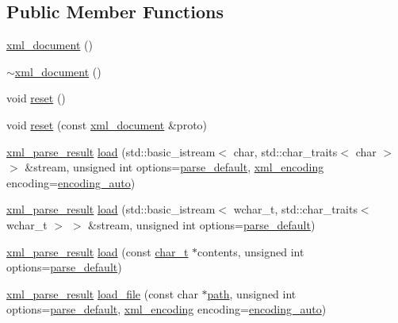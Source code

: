 \subsection*{Public Member Functions}
\begin{DoxyCompactItemize}
\item 
\hyperlink{classpugi_1_1xml__document_afa82ca6827bda8504ce7dadbc443fa21}{xml\-\_\-document} ()
\item 
\hyperlink{classpugi_1_1xml__document_af37d8a79f7465ad48d65c2bd13461580}{$\sim$xml\-\_\-document} ()
\item 
void \hyperlink{classpugi_1_1xml__document_acf2b9daf1d12e12048796118b7a7685d}{reset} ()
\item 
void \hyperlink{classpugi_1_1xml__document_a4230de3de88f4fe481c4c3d5312aa5cf}{reset} (const \hyperlink{classpugi_1_1xml__document}{xml\-\_\-document} \&proto)
\item 
\hyperlink{structpugi_1_1xml__parse__result}{xml\-\_\-parse\-\_\-result} \hyperlink{classpugi_1_1xml__document_abb7db3882f94ac35b870510789a87778}{load} (std\-::basic\-\_\-istream$<$ char, std\-::char\-\_\-traits$<$ char $>$ $>$ \&stream, unsigned int options=\hyperlink{namespacepugi_ad7c927d1c1752330637c3318b0d7b366}{parse\-\_\-default}, \hyperlink{namespacepugi_a03f708f86abeff5fce6842ffd6a0951e}{xml\-\_\-encoding} encoding=\hyperlink{namespacepugi_a03f708f86abeff5fce6842ffd6a0951eae11b2ef666f03e77b7e764e38d22dc17}{encoding\-\_\-auto})
\item 
\hyperlink{structpugi_1_1xml__parse__result}{xml\-\_\-parse\-\_\-result} \hyperlink{classpugi_1_1xml__document_a36131b6f1a80a1248666f4e7fe352685}{load} (std\-::basic\-\_\-istream$<$ wchar\-\_\-t, std\-::char\-\_\-traits$<$ wchar\-\_\-t $>$ $>$ \&stream, unsigned int options=\hyperlink{namespacepugi_ad7c927d1c1752330637c3318b0d7b366}{parse\-\_\-default})
\item 
\hyperlink{structpugi_1_1xml__parse__result}{xml\-\_\-parse\-\_\-result} \hyperlink{classpugi_1_1xml__document_ae17a77772fa21a40f3d91d9c79e60d0b}{load} (const \hyperlink{namespacepugi_aef5a7a62cba0507542220ea15afe39df}{char\-\_\-t} $\ast$contents, unsigned int options=\hyperlink{namespacepugi_ad7c927d1c1752330637c3318b0d7b366}{parse\-\_\-default})
\item 
\hyperlink{structpugi_1_1xml__parse__result}{xml\-\_\-parse\-\_\-result} \hyperlink{classpugi_1_1xml__document_aad350209a4a91589fbd7e8cdaf79e010}{load\-\_\-file} (const char $\ast$\hyperlink{classpugi_1_1xml__node_ae5694be88058346ad8e6e418410d4979}{path}, unsigned int options=\hyperlink{namespacepugi_ad7c927d1c1752330637c3318b0d7b366}{parse\-\_\-default}, \hyperlink{namespacepugi_a03f708f86abeff5fce6842ffd6a0951e}{xml\-\_\-encoding} encoding=\hyperlink{namespacepugi_a03f708f86abeff5fce6842ffd6a0951eae11b2ef666f03e77b7e764e38d22dc17}{encoding\-\_\-auto})

\end{DoxyCompactItemize}
